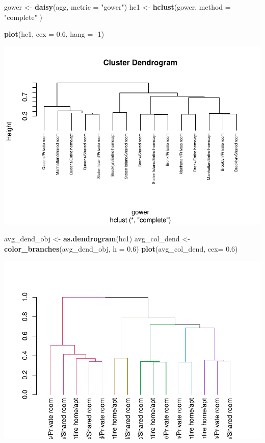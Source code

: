 \documentclass[
]{article}
\newenvironment{Shaded}{\begin{snugshade}}{\end{snugshade}}
\newcommand{\DataTypeTok}[1]{\textcolor[rgb]{0.13,0.29,0.53}{#1}}
\newcommand{\DecValTok}[1]{\textcolor[rgb]{0.00,0.00,0.81}{#1}}
\newcommand{\FloatTok}[1]{\textcolor[rgb]{0.00,0.00,0.81}{#1}}
\newcommand{\KeywordTok}[1]{\textcolor[rgb]{0.13,0.29,0.53}{\textbf{#1}}}
\newcommand{\NormalTok}[1]{#1}
\newcommand{\StringTok}[1]{\textcolor[rgb]{0.31,0.60,0.02}{#1}}
\begin{document}
\begin{Shaded}
\begin{Highlighting}[]
\NormalTok{gower <-}\StringTok{ }\KeywordTok{daisy}\NormalTok{(agg, }\DataTypeTok{metric =} \StringTok{"gower"}\NormalTok{)}
\NormalTok{hc1 <-}\StringTok{ }\KeywordTok{hclust}\NormalTok{(gower, }\DataTypeTok{method =} \StringTok{"complete"}\NormalTok{ )}

\KeywordTok{plot}\NormalTok{(hc1, }\DataTypeTok{cex =} \FloatTok{0.6}\NormalTok{, }\DataTypeTok{hang =} \DecValTok{-1}\NormalTok{)}
\end{Highlighting}
\end{Shaded}

\includegraphics{project-code_files/figure-latex/unnamed-chunk-27-1.pdf}

\begin{Shaded}
\begin{Highlighting}[]
\NormalTok{avg_dend_obj <-}\StringTok{ }\KeywordTok{as.dendrogram}\NormalTok{(hc1)}
\NormalTok{avg_col_dend <-}\StringTok{ }\KeywordTok{color_branches}\NormalTok{(avg_dend_obj, }\DataTypeTok{h =} \FloatTok{0.6}\NormalTok{)}
\KeywordTok{plot}\NormalTok{(avg_col_dend, }\DataTypeTok{cex=} \FloatTok{0.6}\NormalTok{)}
\end{Highlighting}
\end{Shaded}

\includegraphics{project-code_files/figure-latex/unnamed-chunk-28-1.pdf}
\end{document}
